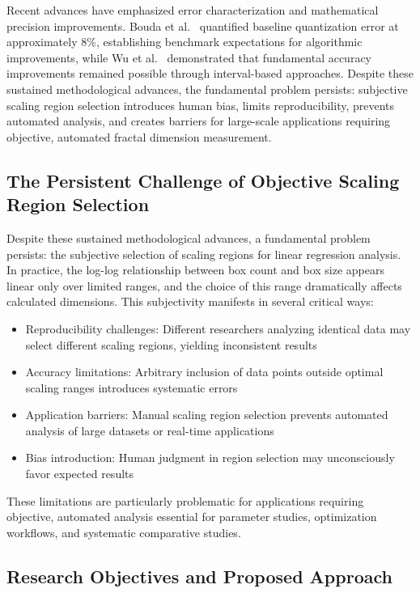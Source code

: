 \documentclass[preprint,12pt]{elsarticle}
\def\textbf#1{#1}%
\begin{document}
Recent advances have emphasized error characterization and mathematical precision improvements. Bouda et al.~\cite{bouda2016} quantified baseline quantization error at approximately 8\%, establishing benchmark expectations for algorithmic improvements, while Wu et al.~\cite{wu2020} demonstrated that fundamental accuracy improvements remained possible through interval-based approaches. Despite these sustained methodological advances, the fundamental problem persists: subjective scaling region selection introduces human bias, limits reproducibility, prevents automated analysis, and creates barriers for large-scale applications requiring objective, automated fractal dimension measurement.

\subsection{The Persistent Challenge of Objective Scaling Region Selection}

Despite these sustained methodological advances, a fundamental problem persists: the subjective selection of scaling regions for linear regression analysis. In practice, the log-log relationship between box count and box size appears linear only over limited ranges, and the choice of this range dramatically affects calculated dimensions. This subjectivity manifests in several critical ways:

\begin{itemize}
\item \textbf{Reproducibility challenges}: Different researchers analyzing identical data may select different scaling regions, yielding inconsistent results
\item \textbf{Accuracy limitations}: Arbitrary inclusion of data points outside optimal scaling ranges introduces systematic errors
\item \textbf{Application barriers}: Manual scaling region selection prevents automated analysis of large datasets or real-time applications
\item \textbf{Bias introduction}: Human judgment in region selection may unconsciously favor expected results
\end{itemize}

These limitations are particularly problematic for applications requiring objective, automated analysis essential for parameter studies, optimization workflows, and systematic comparative studies.

\subsection{Research Objectives and Proposed Approach}
\end{document}
